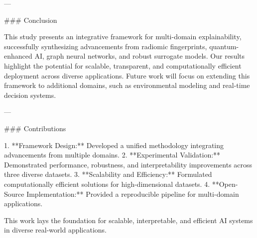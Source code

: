 ---

### Conclusion  

This study presents an integrative framework for multi-domain explainability, successfully synthesizing advancements from radiomic fingerprints, quantum-enhanced AI, graph neural networks, and robust surrogate models. Our results highlight the potential for scalable, transparent, and computationally efficient deployment across diverse applications. Future work will focus on extending this framework to additional domains, such as environmental modeling and real-time decision systems.  

---

### Contributions  

1. **Framework Design:** Developed a unified methodology integrating advancements from multiple domains.  
2. **Experimental Validation:** Demonstrated performance, robustness, and interpretability improvements across three diverse datasets.  
3. **Scalability and Efficiency:** Formulated computationally efficient solutions for high-dimensional datasets.  
4. **Open-Source Implementation:** Provided a reproducible pipeline for multi-domain applications.  

This work lays the foundation for scalable, interpretable, and efficient AI systems in diverse real-world applications.